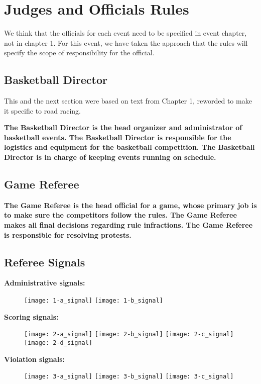 
\chapter{Judges and Officials Rules}

\begin{framed}
We think that the officials for each event need to be specified in event chapter, not in chapter 1. For this event, we have taken the approach that the rules will specify the scope of responsibility for the official.
\end{framed}

\section{Basketball Director}

\begin{framed}
This and the next section were based on text from Chapter 1, reworded to make it specific to road racing.
\end{framed}

\textbf{The Basketball Director is the head organizer and administrator of basketball events. The Basketball Director is responsible for the logistics and
equipment for the basketball competition.  The
Basketball Director is in charge of keeping events running on schedule.}

\section{Game Referee}

\textbf{The Game Referee is the head official for a game, whose primary job is to make sure
the competitors follow the rules.  The Game Referee makes all final decisions
regarding rule infractions. The Game Referee is responsible for resolving
protests.}

\newpage
\section{Referee Signals}

\textbf{Administrative signals:}

\begin{figure}[h]
\texttt{[image: 1-a\_signal]}
\texttt{[image: 1-b\_signal]}
\end{figure}

\textbf{Scoring signals:}
\begin{figure}[h]
\texttt{[image: 2-a\_signal]}
\texttt{[image: 2-b\_signal]}
\texttt{[image: 2-c\_signal]}
\texttt{[image: 2-d\_signal]}
\end{figure}

\textbf{Violation signals:}

\begin{figure}[h]
\texttt{[image: 3-a\_signal]}
\texttt{[image: 3-b\_signal]}
\texttt{[image: 3-c\_signal]}
\end{figure}
